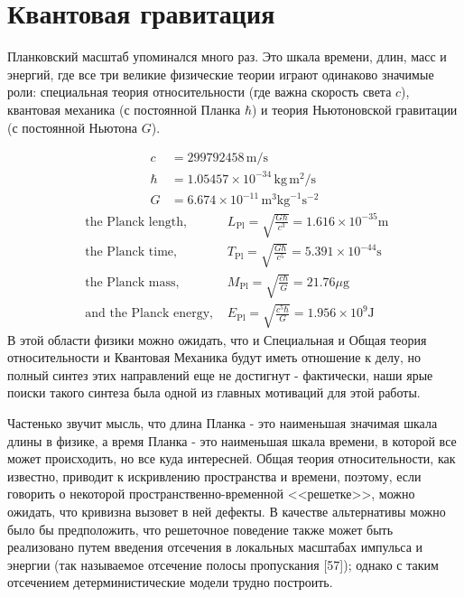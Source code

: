 \documentclass[main.tex]{subfiles}
\begin{document}
\section{Квантовая гравитация}\label{ch6}

Планковский масштаб упоминался много раз. Это шкала времени, длин, масс и энергий, где все три великие физические теории играют одинаково значимые роли: специальная теория относительности (где важна скорость света $c$), квантовая механика (с постоянной Планка $\hbar$) и теория Ньютоновской гравитации (с постоянной Ньютона $G$).

\begin{equation}\label{6.1}
	\begin{aligned} c &=299792458 \,\mathrm{m} / \mathrm{s} \\ \hbar &=1.05457 \times 10^{-34} \,\mathrm{kg}\, \mathrm{m}^{2} / \mathrm{s} \\ G &=6.674 \times 10^{-11}\, \mathrm{m}^{3} \mathrm{kg}^{-1} \mathrm{s}^{-2} \end{aligned}
\end{equation}
\begin{equation}\label{6.2}
	\begin{array}{ll}{\text { the Planck length, }} & {L_{\mathrm{Pl}}=\sqrt{\frac{G \hbar}{c^{3}}}=1.616 \times 10^{-35} \mathrm{m}} \\ {\text { the Planck time, }} & {T_{\mathrm{Pl}}=\sqrt{\frac{G \hbar}{c^{5}}}=5.391 \times 10^{-44} \mathrm{s}} \\ {\text { the Planck mass, }} & {M_{\mathrm{Pl}}=\sqrt{\frac{c \hbar}{G}}=21.76 \mu \mathrm{g}} \\ {\text { and the Planck energy, }} & {E_{\mathrm{Pl}}=\sqrt{\frac{c^{5} \hbar}{G}}=1.956 \times 10^{9} \mathrm{J}}\end{array}
\end{equation}
В этой области физики можно ожидать, что и Специальная и Общая теория относительности и Квантовая Механика будут иметь отношение к делу, но полный синтез этих направлений еще не достигнут - фактически, наши ярые поиски  такого синтеза была одной из главных мотиваций для этой работы.

Частенько звучит мысль, что длина Планка - это наименьшая значимая шкала длины в физике, а время Планка - это наименьшая шкала времени, в которой все может происходить, но все куда интересней. Общая теория относительности, как известно, приводит к искривлению пространства и времени, поэтому, если говорить о некоторой пространственно-временной <<решетке>>, можно ожидать, что кривизна вызовет в ней дефекты. В качестве альтернативы можно было бы предположить, что решеточное поведение также может быть реализовано путем введения отсечения в локальных масштабах импульса и энергии (так называемое отсечение полосы пропускания [57]); однако с таким отсечением детерминистические модели трудно построить.
\end{document}
